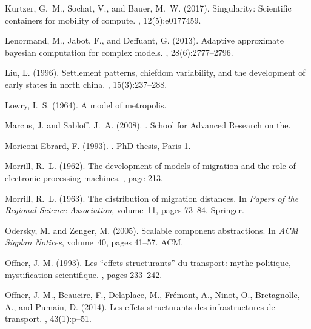 \documentclass[10pt]{article}
\begin{document}
\begin{thebibliography}{}
Kurtzer, G.~M., Sochat, V., and Bauer, M.~W. (2017).
\newblock Singularity: Scientific containers for mobility of compute.
, 12(5):e0177459.

Lenormand, M., Jabot, F., and Deffuant, G. (2013).
\newblock Adaptive approximate bayesian computation for complex models.
, 28(6):2777--2796.

Liu, L. (1996).
\newblock Settlement patterns, chiefdom variability, and the development of
  early states in north china.
, 15(3):237--288.

Lowry, I.~S. (1964).
\newblock A model of metropolis.

Marcus, J. and Sabloff, J.~A. (2008).
.
\newblock School for Advanced Research on the.

Moriconi-Ebrard, F. (1993).
.
\newblock PhD thesis, Paris 1.

Morrill, R.~L. (1962).
\newblock The development of models of migration and the role of electronic
  processing machines.
, page 213.

Morrill, R.~L. (1963).
\newblock The distribution of migration distances.
\newblock In {\em Papers of the Regional Science Association}, volume~11, pages
  73--84. Springer.

Odersky, M. and Zenger, M. (2005).
\newblock Scalable component abstractions.
\newblock In {\em ACM Sigplan Notices}, volume~40, pages 41--57. ACM.

Offner, J.-M. (1993).
\newblock Les ``effets structurants'' du transport: mythe politique,
  mystification scientifique.
, pages 233--242.

Offner, J.-M., Beaucire, F., Delaplace, M., Fr{\'e}mont, A., Ninot, O.,
  Bretagnolle, A., and Pumain, D. (2014).
\newblock Les effets structurants des infrastructures de transport.
, 43(1):p--51.


\end{thebibliography}
\end{document}
